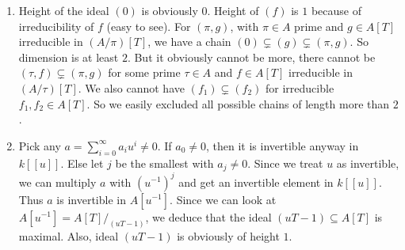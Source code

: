 \newcommand{\sheet}{3}




\maketitle

\begin{exercise}{1}
    \begin{enumerate}
        \item Height of the ideal $(0)$ is obviously $0$. Height of $(f)$ is $1$
            because of irreducibility of $f$ (easy to see). For $(\pi, g)$, with
            $\pi \in A$ prime and $g \in A[T]$ irreducible in $(A/\pi)[T]$, we
            have a chain $(0) \subsetneq (g) \subsetneq (\pi, g)$. So dimension
            is at least $2$. But it obviously cannot be more, there cannot be
            $(\tau, f) \subsetneq (\pi, g)$ for some prime $\tau \in A$ and $f
            \in A[T]$ irreducible in $(A/\tau)[T]$. We also cannot have $(f_1)
            \subsetneq (f_2)$ for irreducible $f_1, f_2 \in A[T]$. So we easily
            excluded all possible chains of length more than $2$.
        \item Pick any $a = \sum^{\infty}_{i=0} a_i u^i \not= 0$. If $a_0 \not=
            0$, then it is invertible anyway in $k[[u]]$. Else let $j$ be the
            smallest with $a_j \not= 0$. Since we treat $u$ as invertible, we
            can multiply $a$ with ${(u^{-1})}^j$ and get an invertible element
            in $k[[u]]$. Thus $a$ is invertible in $A[u^{-1}]$. Since we can
            look at $A[u^{-1}] = A[T] /_{(uT-1)}$, we deduce that the ideal
            $(uT-1) \subseteq A[T]$ is maximal. Also, ideal $(uT - 1)$ is
            obviously of height $1$.
    \end{enumerate}
\end{exercise}

